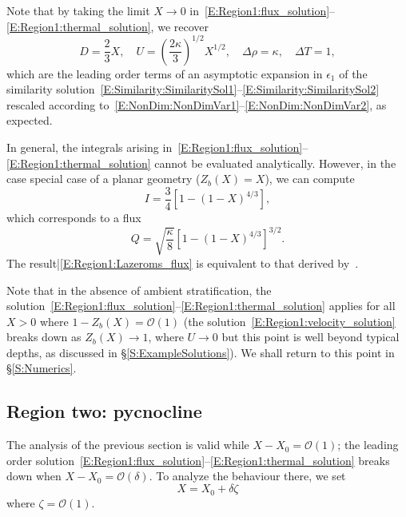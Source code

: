 \documentclass[openacc]{rsproca_new}%
\newcommand{\order}[1]{\mathcal{O}(#1)}
\newcommand{\epsone}{\epsilon_{1}} %
\newcommand{\lt}{\delta} %
\begin{document}
Note that by taking the limit $X \to 0$ in~\eqref{E:Region1:flux_solution}--\eqref{E:Region1:thermal_solution}, we recover 
\begin{equation}\label{E:Region1:dimensionless_similarity}
D = \frac{2}{3}X, \quad U = \left(\frac{2\kappa}{3}\right)^{1/2}X^{1/2}, \quad \Delta \rho = \kappa, \quad \Delta T = 1,
\end{equation} 
which are the leading order terms of an asymptotic expansion in $\epsone$ of the similarity solution~\eqref{E:Similarity:SimilaritySol1}--\eqref{E:Similarity:SimilaritySol2} rescaled according to~\eqref{E:NonDim:NonDimVar1}--\eqref{E:NonDim:NonDimVar2}, as expected.

In general, the integrals arising in~\eqref{E:Region1:flux_solution}--\eqref{E:Region1:thermal_solution} cannot be evaluated analytically. However, in the case special case of a planar geometry ($Z_b(X) = X$), we can compute
\begin{equation}
    I = \frac{3}{4}\left[1 - (1 - X)^{4/3}\right],
\end{equation}
which corresponds to a flux
\begin{equation}\label{E:Region1:Lazeroms_flux}
Q =  \sqrt{\frac{\kappa}{8}}\left[1 - (1-X)^{4/3}\right]^{3/2}.
\end{equation}
The result|\eqref{E:Region1:Lazeroms_flux} is equivalent to that derived by~\cite{Lazeroms2019JPhysOcean}.

Note that in the absence of ambient stratification, the solution~\eqref{E:Region1:flux_solution}--\eqref{E:Region1:thermal_solution} applies for all $X> 0$ where $1 - Z_b(X) = \mathcal{O}(1)$ (the solution~\eqref{E:Region1:velocity_solution} breaks down as $Z_b(X) \to 1$, where $U \to 0$ but this point is well beyond typical depths, as discussed in \S\ref{S:ExampleSolutions}). We shall return to this point in \S\ref{S:Numerics}.

\subsection{Region two: pycnocline}\label{S:Asymptotics:Region2}
The analysis of the previous section is valid while $X - X_0 = \mathcal{O}(1)$; the leading order solution~\eqref{E:Region1:flux_solution}--\eqref{E:Region1:thermal_solution} breaks down when $X - X_0 = \order{\delta}$. To analyze the behaviour there, we set
\begin{equation}\label{E:pycnocline:length_scaling}
X = X_0 + \lt \zeta
\end{equation}
where $\zeta = \mathcal{O}(1)$. 
\end{document}
